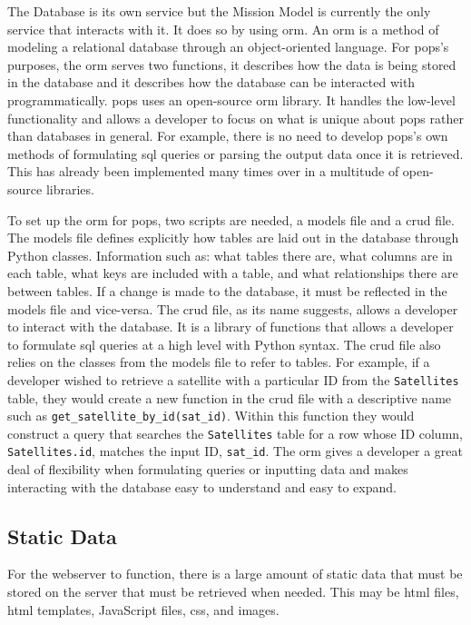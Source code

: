 The Database is its own service but the Mission Model is currently the only
service that interacts with it. It does so by using \gls{orm}. An \gls{orm} is
a method of modeling a relational database through an object-oriented language.
For \gls{pops}'s purposes, the \gls{orm} serves two functions, it describes how
the data is being stored in the database and it describes how the database can
be interacted with programmatically. \gls{pops} uses an open-source \gls{orm}
library. It handles the low-level functionality and allows a developer to focus
on what is unique about \gls{pops} rather than databases in general. For
example, there is no need to develop \gls{pops}'s own methods of formulating
\gls{sql} queries or parsing the output data once it is retrieved.  This has
already been implemented many times over in a multitude of open-source
libraries. 

To set up the \gls{orm} for \gls{pops}, two scripts are needed, a models file
and a \gls{crud} file. The models file defines explicitly how tables are laid
out in the database through Python classes. Information such as: what tables
there are, what columns are in each table, what keys are included with a table,
and what relationships there are between tables. If a change is made to the
database, it must be reflected in the models file and vice-versa.  The
\gls{crud} file, as its name suggests, allows a developer to interact with the
database.  It is a library of functions that allows a developer to formulate
\gls{sql} queries at a high level with Python syntax. The \gls{crud} file also
relies on the classes from the models file to refer to tables. For example, if
a developer wished to retrieve a satellite with a particular ID from the
\texttt{Satellites} table, they would create a new function in the \gls{crud}
file with a descriptive name such as \texttt{get\_satellite\_by\_id(sat\_id)}.
Within this function they would construct a query that searches the
\texttt{Satellites} table for a row whose ID column, \texttt{Satellites.id},
matches the input ID, \texttt{sat\_id}. The \gls{orm} gives a developer a great
deal of flexibility when formulating queries or inputting data and makes
interacting with the database easy to understand and easy to expand.


\subsection{Static Data}

For the webserver to function, there is a large amount of static data that must
be stored on the server that must be retrieved when needed. This may be
\gls{html} files, \gls{html} templates, JavaScript files, \gls{css}, and
images.

